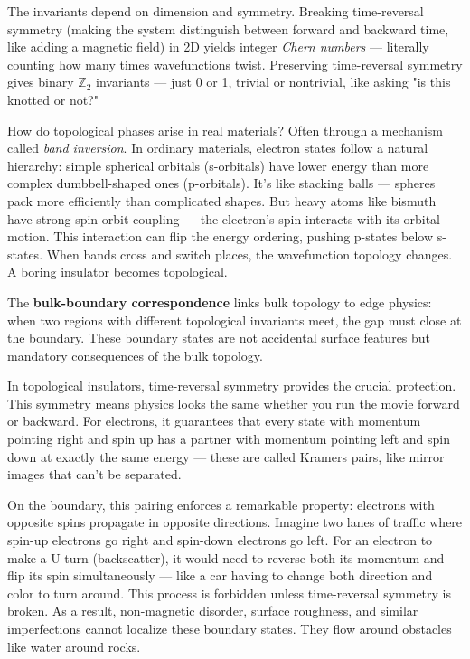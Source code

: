 The invariants depend on dimension and symmetry. Breaking time-reversal symmetry (making the system distinguish between forward and backward time, like adding a magnetic field) in 2D yields integer \emph{Chern numbers} — literally counting how many times wavefunctions twist. Preserving time-reversal symmetry gives binary \(\mathbb{Z}_2\) invariants — just 0 or 1, trivial or nontrivial, like asking "is this knotted or not?"

How do topological phases arise in real materials? Often through a mechanism called \emph{band inversion}. In ordinary materials, electron states follow a natural hierarchy: simple spherical orbitals (s-orbitals) have lower energy than more complex dumbbell-shaped ones (p-orbitals). It's like stacking balls — spheres pack more efficiently than complicated shapes. But heavy atoms like bismuth have strong spin-orbit coupling — the electron's spin interacts with its orbital motion. This interaction can flip the energy ordering, pushing p-states below s-states. When bands cross and switch places, the wavefunction topology changes. A boring insulator becomes topological.

The \textbf{bulk-boundary correspondence} links bulk topology to edge physics: when two regions with different topological invariants meet, the gap must close at the boundary. These boundary states are not accidental surface features but mandatory consequences of the bulk topology.

In topological insulators, time-reversal symmetry provides the crucial protection. This symmetry means physics looks the same whether you run the movie forward or backward. For electrons, it guarantees that every state with momentum pointing right and spin up has a partner with momentum pointing left and spin down at exactly the same energy — these are called Kramers pairs, like mirror images that can't be separated.

On the boundary, this pairing enforces a remarkable property: electrons with opposite spins propagate in opposite directions. Imagine two lanes of traffic where spin-up electrons go right and spin-down electrons go left. For an electron to make a U-turn (backscatter), it would need to reverse both its momentum and flip its spin simultaneously — like a car having to change both direction and color to turn around. This process is forbidden unless time-reversal symmetry is broken. As a result, non-magnetic disorder, surface roughness, and similar imperfections cannot localize these boundary states. They flow around obstacles like water around rocks.

